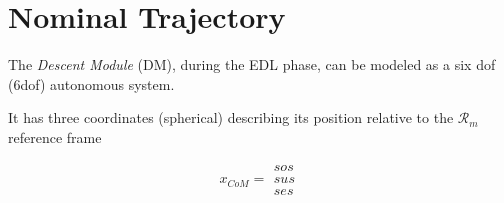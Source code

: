 \chapter{Nominal Trajectory}

The \textit{Descent Module} (DM), during the EDL phase, can be modeled as a
six dof (6dof) autonomous system.

It has three coordinates (spherical) describing its position relative to the
$\mathcal{R}_{m}$ reference frame

$$ x_{CoM} = \begin{matrix}
    sos \\
    sus \\
    ses
\end{matrix}$$